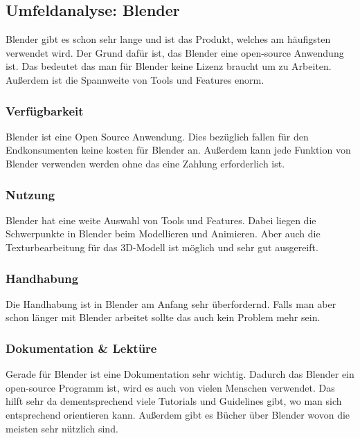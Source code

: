 \pagebreak

\subsection{Umfeldanalyse: Blender}
Blender gibt es schon sehr lange und ist das Produkt, welches am häufigsten verwendet wird. Der Grund dafür ist, das Blender eine open-source Anwendung ist. Das bedeutet das man für Blender keine Lizenz braucht um zu Arbeiten. Außerdem ist die Spannweite von Tools und Features enorm.




\subsubsection{Verfügbarkeit}
 Blender ist eine Open Source Anwendung. Dies bezüglich fallen für den Endkonsumenten keine kosten für Blender an. Außerdem kann jede Funktion von Blender verwenden werden ohne das eine Zahlung erforderlich ist.


\subsubsection{Nutzung}
Blender hat eine weite Auswahl von Tools und Features. Dabei liegen die Schwerpunkte in Blender beim Modellieren und Animieren. Aber auch die Texturbearbeitung für das 3D-Modell ist möglich und sehr gut ausgereift.

\subsubsection{Handhabung}
Die Handhabung ist in Blender am Anfang sehr überfordernd. Falls man aber schon länger mit Blender arbeitet sollte das auch kein Problem mehr sein.

\subsubsection{Dokumentation \& Lektüre}
Gerade für Blender ist eine Dokumentation sehr wichtig. Dadurch das Blender ein open-source Programm ist, wird es auch von vielen Menschen verwendet. Das hilft sehr da dementsprechend viele Tutorials und Guidelines gibt, wo man sich entsprechend orientieren kann. Außerdem gibt es Bücher über Blender wovon die meisten sehr nützlich sind.

\pagebreak


